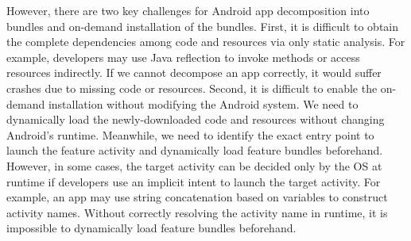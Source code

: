 However, there are two key challenges for Android app decomposition into bundles and on-demand installation of the bundles.
First, it is difficult to obtain the complete dependencies among code and resources via only static analysis. For example, developers may use Java reflection to invoke methods or access resources indirectly. If we cannot decompose an app correctly, it would suffer crashes due to missing code or resources.
Second, it is difficult to enable the on-demand installation without modifying the Android system. We need to dynamically load the newly-downloaded code and resources without changing Android's runtime. Meanwhile, we need to identify the exact entry point to launch the feature activity and dynamically load feature bundles beforehand. However, in some cases, the target activity can be decided only by the OS at runtime if developers use an implicit intent to launch the target activity.
For example, an app may use string concatenation based on variables to construct activity names. Without correctly resolving the activity name in runtime, it is impossible to dynamically load feature bundles beforehand.




